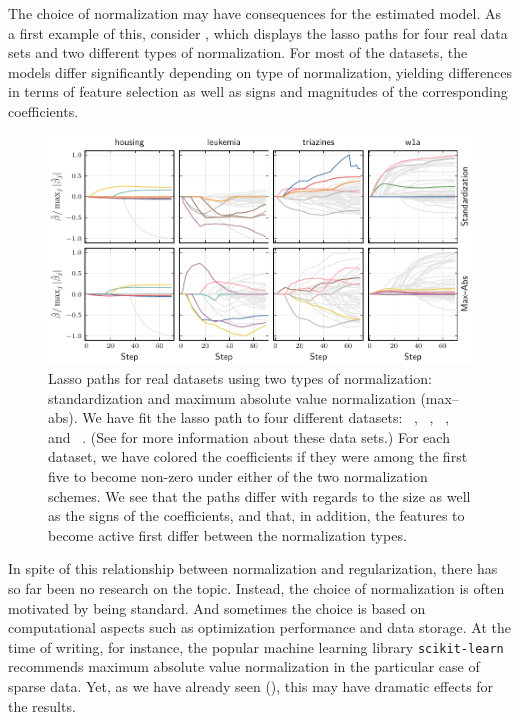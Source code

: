 The choice of normalization may have consequences for the estimated model. As a first
example of this, consider , which displays the lasso paths for
four real data sets and two different types of normalization. For most of the datasets, the
models differ significantly depending on type of normalization, yielding differences in
terms of feature selection as well as signs and magnitudes of the corresponding
coefficients.

\begin{figure}[bpt]
  \centering
  \includegraphics[]{plots/realdata_paths.pdf}
  \caption{%
    Lasso paths for real datasets using two types of normalization:
    standardization and maximum absolute value normalization (max--abs). We have fit
    the lasso path to four different datasets:
    ~\citep{harrison1978}, ~\citep{golub1999},
    ~\citep{king}, and ~\citep{platt1998}. (See 
    for more information about these data sets.) For each
    dataset, we have colored the coefficients if they were among the first five
    to become non-zero under either of the two normalization schemes. We see
    that the paths differ with regards to the size as well as the signs of the
    coefficients, and that, in addition, the features to become active first
    differ between the normalization types.
  }
  \label{fig:realdata-paths}
\end{figure}

In spite of this relationship between normalization and regularization, there has so far
been no research on the topic. Instead, the choice of normalization is often motivated by
being standard. And sometimes the choice is based on computational aspects such as
optimization performance and data storage. At the time of writing, for instance, the
popular machine learning library \texttt{scikit-learn}~\citep{scikit-learndevelopers2024}
recommends maximum absolute value normalization in the particular case of sparse data. Yet,
as we have already seen (), this may have dramatic effects for the
results.

